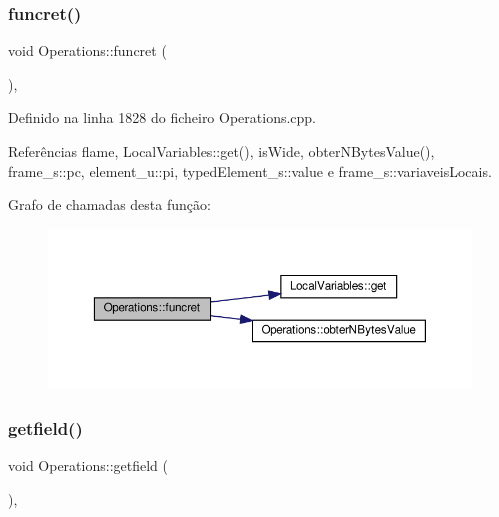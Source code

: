 \subsubsection{\texorpdfstring{funcret()}{funcret()}}
{\footnotesize\ttfamily void Operations\+::funcret (\begin{DoxyParamCaption}{ }\end{DoxyParamCaption})\hspace{0.3cm}{\ttfamily [static]}, {\ttfamily [private]}}



Definido na linha 1828 do ficheiro Operations.\+cpp.



Referências flame, Local\+Variables\+::get(), is\+Wide, obter\+N\+Bytes\+Value(), frame\+\_\+s\+::pc, element\+\_\+u\+::pi, typed\+Element\+\_\+s\+::value e frame\+\_\+s\+::variaveis\+Locais.

Grafo de chamadas desta função\+:
\nopagebreak
\begin{figure}[H]
\begin{center}
\leavevmode
\includegraphics[width=350pt]{classOperations_a1880a30623072f8388be782dcf1a390e_cgraph}
\end{center}
\end{figure}
\mbox{\label{classOperations_a0bb399fe0f64dc21699132c092560e19}} 
\subsubsection{\texorpdfstring{getfield()}{getfield()}}
{\footnotesize\ttfamily void Operations\+::getfield (\begin{DoxyParamCaption}{ }\end{DoxyParamCaption})\hspace{0.3cm}{\ttfamily [static]}, {\ttfamily [private]}}



